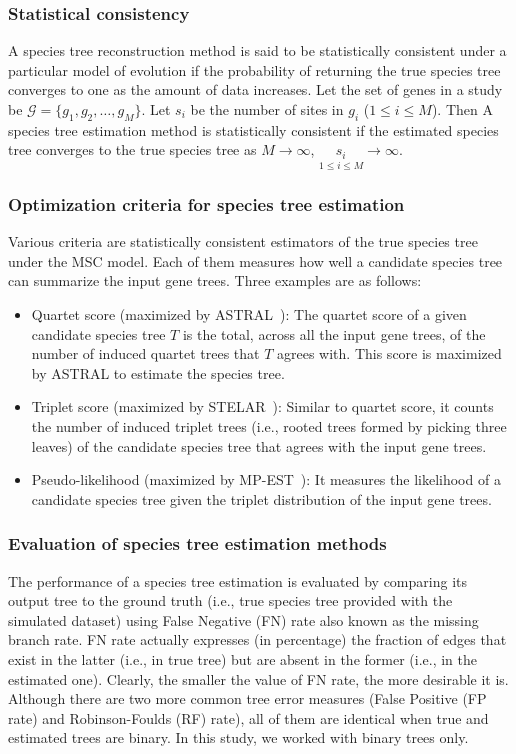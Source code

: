 \subsubsection{Statistical consistency}

A species tree reconstruction method is said to be statistically consistent under a particular model of evolution if the probability of returning the true species tree converges to one as the amount of data increases. Let the set of genes in a study be $\mathcal{G} = \{g_1, g_2, \dots, g_M\}$. Let $s_i$ be the number of sites in $g_i$ ($1 \leq i \leq M$). Then A species tree estimation method is statistically consistent if the estimated species tree converges to the true species tree as $M \rightarrow \infty$, $\underset{1 \leq i \leq M}{s_i} \rightarrow \infty$.


\subsubsection{Optimization criteria for species tree estimation}
Various criteria are statistically consistent estimators of the true species tree under the MSC model. Each of them measures how well a candidate species tree can summarize the input gene trees. Three examples are as follows:
\begin{itemize}
	\item Quartet score (maximized by ASTRAL~\cite{mirarab2014astral}): The quartet score of a given candidate species tree $T$ is the total, across all the input gene trees, of the number of induced quartet trees that $T$ agrees with. This score is maximized by ASTRAL to estimate the species tree.\item Triplet score (maximized by STELAR~\cite{islam2019stelar}): Similar to quartet score, it counts the number of induced triplet trees (i.e., rooted trees formed by picking three leaves) of the candidate species tree that agrees with the input gene trees.
	\item Pseudo-likelihood (maximized by MP-EST~\cite{mpest}): It measures the likelihood of a candidate species tree given the triplet distribution of the input gene trees.\end{itemize}

\subsubsection{Evaluation of species tree estimation methods}\label{sec:phyPerf}
The performance of a species tree estimation is evaluated by comparing its output tree to the ground truth (i.e., true species tree provided with the simulated dataset) using False Negative (FN) rate also known as the missing branch rate. FN rate actually expresses (in percentage) the fraction of edges that exist in the latter (i.e., in true tree) but are absent in the former (i.e., in the estimated one). Clearly, the smaller the
value of FN rate, the more desirable it is. Although there are
two more common tree error measures (False Positive (FP rate)
and Robinson-Foulds (RF) rate), all of them are identical
when true and estimated trees are binary. In this study, we
worked with binary trees only.

